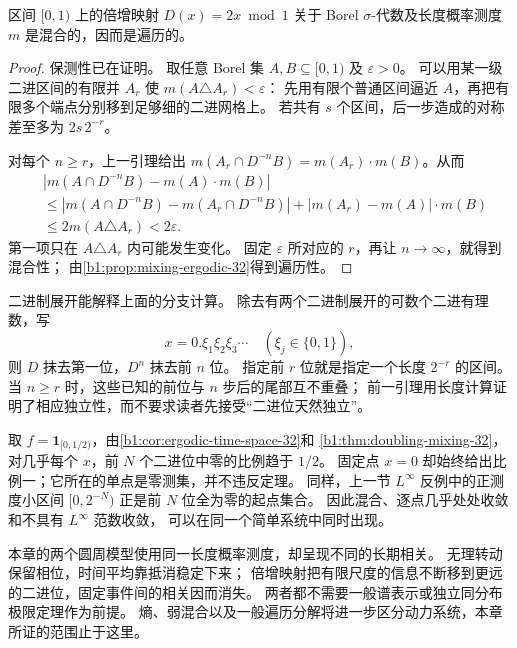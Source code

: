 \begin{theorem}[倍增映射的混合性]
\label{b1:thm:doubling-mixing-32}
区间 \([0,1)\) 上的倍增映射 \(D(x)=2x\bmod1\)
关于 Borel \(\sigma\)-代数及长度概率测度 \(m\) 是混合的，因而是遍历的。
\end{theorem}
\begin{proof}
保测性已在证明。
取任意 Borel 集 \(A,B\subseteq[0,1)\) 及 \(\varepsilon>0\)。
可以用某一级二进区间的有限并 \(A_r\) 使 \(m(A\triangle A_r)<\varepsilon\)：
先用有限个普通区间逼近 \(A\)，再把有限多个端点分别移到足够细的二进网格上。
若共有 \(s\) 个区间，后一步造成的对称差至多为 \(2s\,2^{-r}\)。

对每个 \(n\geq r\)，上一引理给出
\(m(A_r\cap D^{-n}B)=m(A_r)\cdot m(B)\)。从而
\[
 \begin{aligned}
 &|m(A\cap D^{-n}B)-m(A)\cdot m(B)|\\
 &\leq|m(A\cap D^{-n}B)-m(A_r\cap D^{-n}B)|
       +|m(A_r)-m(A)|\cdot m(B)\\
 &\leq2m(A\triangle A_r)<2\varepsilon.
 \end{aligned}
\]
第一项只在 \(A\triangle A_r\) 内可能发生变化。
固定 \(\varepsilon\) 所对应的 \(r\)，再让 \(n\to\infty\)，就得到混合性；
由\cref{b1:prop:mixing-ergodic-32}得到遍历性。
\end{proof}

二进制展开能解释上面的分支计算。
除去有两个二进制展开的可数个二进有理数，写
\[
 x=0.\xi_1\xi_2\xi_3\cdots\quad(\xi_j\in\{0,1\}),
\]
则 \(D\) 抹去第一位，\(D^n\) 抹去前 \(n\) 位。
指定前 \(r\) 位就是指定一个长度 \(2^{-r}\) 的区间。
当 \(n\geq r\) 时，这些已知的前位与 \(n\) 步后的尾部互不重叠；
前一引理用长度计算证明了相应独立性，而不要求读者先接受“二进位天然独立”。

\ProseParagraphBreak

取 \(f=\mathbf1_{[0,1/2)}\)，由\cref{b1:cor:ergodic-time-space-32}和
\cref{b1:thm:doubling-mixing-32}，对几乎每个 \(x\)，前 \(N\) 个二进位中零的比例趋于 \(1/2\)。
固定点 \(x=0\) 却始终给出比例一；它所在的单点是零测集，并不违反定理。
同样，上一节 \(L^\infty\) 反例中的正测度小区间
\([0,2^{-N})\) 正是前 \(N\) 位全为零的起点集合。
因此混合、逐点几乎处处收敛和不具有 \(L^\infty\) 范数收敛，
可以在同一个简单系统中同时出现。

\ProseParagraphBreak

本章的两个圆周模型使用同一长度概率测度，却呈现不同的长期相关。
无理转动保留相位，时间平均靠抵消稳定下来；
倍增映射把有限尺度的信息不断移到更远的二进位，固定事件间的相关因而消失。
两者都不需要一般谱表示或独立同分布极限定理作为前提。
熵、弱混合以及一般遍历分解将进一步区分动力系统，本章所证的范围止于这里。
